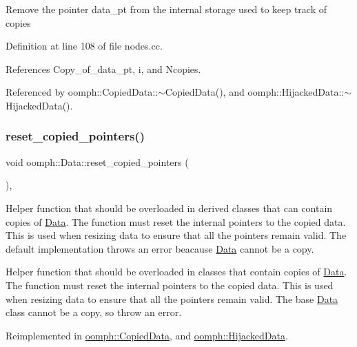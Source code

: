 Remove the pointer data\+\_\+pt from the internal storage used to keep track of copies 

Definition at line 108 of file nodes.\+cc.



References Copy\+\_\+of\+\_\+data\+\_\+pt, i, and Ncopies.



Referenced by oomph\+::\+Copied\+Data\+::$\sim$\+Copied\+Data(), and oomph\+::\+Hijacked\+Data\+::$\sim$\+Hijacked\+Data().

\mbox{\label{classoomph_1_1Data_afd33533f3ddf61bc34106a4dc72de541}} 
\subsubsection{\texorpdfstring{reset\+\_\+copied\+\_\+pointers()}{reset\_copied\_pointers()}}
{\footnotesize\ttfamily void oomph\+::\+Data\+::reset\+\_\+copied\+\_\+pointers (\begin{DoxyParamCaption}{ }\end{DoxyParamCaption})\hspace{0.3cm}{\ttfamily [protected]}, {\ttfamily [virtual]}}



Helper function that should be overloaded in derived classes that can contain copies of \hyperlink{classoomph_1_1Data}{Data}. The function must reset the internal pointers to the copied data. This is used when resizing data to ensure that all the pointers remain valid. The default implementation throws an error beacause \hyperlink{classoomph_1_1Data}{Data} cannot be a copy. 

Helper function that should be overloaded in classes that contain copies of \hyperlink{classoomph_1_1Data}{Data}. The function must reset the internal pointers to the copied data. This is used when resizing data to ensure that all the pointers remain valid. The base \hyperlink{classoomph_1_1Data}{Data} class cannot be a copy, so throw an error. 

Reimplemented in \hyperlink{classoomph_1_1CopiedData_a7e29b2bb1cf0ebad16afac2e5d7342d8}{oomph\+::\+Copied\+Data}, and \hyperlink{classoomph_1_1HijackedData_ae8253ed64e04771ea3d45c3d84d614d7}{oomph\+::\+Hijacked\+Data}.



